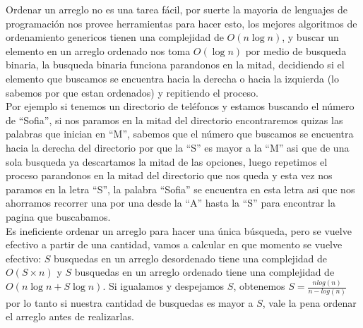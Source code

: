 Ordenar un arreglo no es una tarea fácil, por suerte la mayoria de lenguajes de programación nos provee herramientas para hacer esto, los mejores algoritmos de ordenamiento genericos tienen una complejidad de $O(n\log{}n)$, y buscar un elemento en un arreglo ordenado nos toma $O(\log{}n)$ por medio de busqueda binaria, la busqueda binaria funciona parandonos en la mitad, decidiendo si el elemento que buscamos se encuentra hacia la derecha o hacia la izquierda (lo sabemos por que estan ordenados) y repitiendo el proceso.
\\Por ejemplo si tenemos un directorio de teléfonos y estamos buscando el número de ``Sofia'', si nos paramos en la mitad del directorio encontraremos quizas las palabras que inician en ``M'', sabemos que el número que buscamos se encuentra hacia la derecha del directorio por que la ``S'' es mayor a la ``M'' asi que de una sola busqueda ya descartamos la mitad de las opciones, luego repetimos el proceso parandonos en la mitad del directorio que nos queda y esta vez nos paramos en la letra ``S'', la palabra ``Sofia'' se encuentra en esta letra asi que nos ahorramos recorrer una por una desde la ``A'' hasta la ``S'' para encontrar la pagina que buscabamos.
\\Es ineficiente ordenar un arreglo para hacer una única búsqueda, pero se vuelve efectivo a partir de una cantidad, vamos a calcular en que momento se vuelve efectivo: $S$ busquedas en un arreglo desordenado tiene una complejidad de $O(S\times{}n)$ y $S$ busquedas en un arreglo ordenado tiene una complejidad de $O(n\log{}n + S\log{}n)$. Si igualamos y despejamos $S$, obtenemos $S =\frac{nlog(n)}{n-log(n)}$ por lo tanto si nuestra cantidad de busquedas es mayor a $S$, vale la pena ordenar el arreglo antes de realizarlas.
